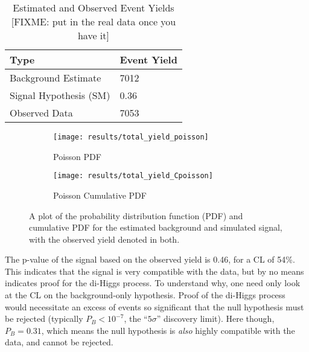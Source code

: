     \begin{table}[tbh]
       \begin{center}
           \caption{Estimated and Observed Event Yields [FIXME: put in the real data once you have it]}
           \label{tab:event_yield}
           \footnotesize
           \begin{tabular}{|l|l|}
           \toprule
               Type  &	Event Yield \\
               \midrule
               Background Estimate  & 7012 \\
               Signal Hypothesis (SM) & 0.36 \\
               Observed Data & 7053 \\
           \bottomrule
           \end{tabular}
       \end{center}
    \end{table}

    \begin{figure}
        \centering
        \begin{subfigure}{0.48\textwidth} 
            \texttt{[image: results/total\_yield\_poisson]}
            \caption{Poisson PDF}
            \label{fig:poisson_sig:pdf}
        \end{subfigure}
        \begin{subfigure}{0.48\textwidth}
            \texttt{[image: results/total\_yield\_Cpoisson]}
            \caption{Poisson Cumulative PDF}
            \label{fig:poisson_sig:Cpdf}
        \end{subfigure}
        \caption{
            A plot of the probability distribution function (PDF)
                and cumulative PDF for the estimated background and simulated signal,
                with the observed yield denoted in both.
        }
    \end{figure}

    The p-value of the signal based on the observed yield is 0.46,
        for a CL of 54\%.
    This indicates that the signal is very compatible with the data,
        but by no means indicates proof for the di-Higgs process.
    To understand why, one need only look at the CL on the background-only hypothesis.
    Proof of the di-Higgs process would necessitate an excess of events so significant that
        the null hypothesis must be rejected (typically $P_B < 10^{-7}$, the ``$5\sigma$'' discovery limit).
    Here though, $P_B = 0.31$, which means the null hypothesis is \textit{also} highly compatible with the data,
        and cannot be rejected.

